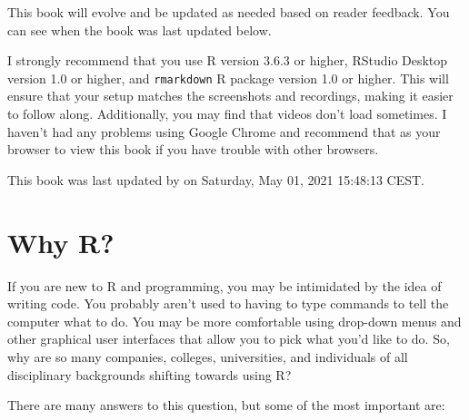 \documentclass[]{tufte-book}
\begin{document}
This book will evolve and be updated as needed based on reader feedback. You can see when the book was last updated below.

I strongly recommend that you use R version 3.6.3 or higher, RStudio Desktop version 1.0 or higher, and \texttt{rmarkdown} R package version 1.0 or higher. This will ensure that your setup matches the screenshots and recordings, making it easier to follow along. Additionally, you may find that videos don't load sometimes. I haven't had any problems using Google Chrome and recommend that as your browser to view this book if you have trouble with other browsers.

This book was last updated by on Saturday, May 01, 2021 15:48:13 CEST.

\hypertarget{whyR}{%
\chapter{Why R?}\label{whyR}}

If you are new to R and programming, you may be intimidated by the idea of writing code. You probably aren't used to having to type commands to tell the computer what to do. You may be more comfortable using drop-down menus and other graphical user interfaces that allow you to pick what you'd like to do. So, why are so many companies, colleges, universities, and individuals of all disciplinary backgrounds shifting towards using R?

There are many answers to this question, but some of the most important are:
\end{document}
